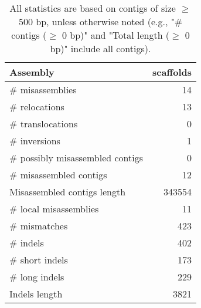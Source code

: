 \documentclass[12pt,a4paper]{article}
\begin{document}
\begin{table}[ht]
\begin{center}
\caption{All statistics are based on contigs of size $\geq$ 500 bp, unless otherwise noted (e.g., "\# contigs ($\geq$ 0 bp)" and "Total length ($\geq$ 0 bp)" include all contigs).}
\begin{tabular}{|l*{1}{|r}|}
\hline
Assembly & scaffolds \\ \hline
\# misassemblies & 14 \\ \hline
\hspace{5mm}\# relocations & 13 \\ \hline
\hspace{5mm}\# translocations & 0 \\ \hline
\hspace{5mm}\# inversions & 1 \\ \hline
\# possibly misassembled contigs & 0 \\ \hline
\# misassembled contigs & 12 \\ \hline
Misassembled contigs length & 343554 \\ \hline
\# local misassemblies & 11 \\ \hline
\# mismatches & 423 \\ \hline
\# indels & 402 \\ \hline
\hspace{5mm}\# short indels & 173 \\ \hline
\hspace{5mm}\# long indels & 229 \\ \hline
Indels length & 3821 \\ \hline
\end{tabular}
\end{center}
\end{table}
\end{document}
